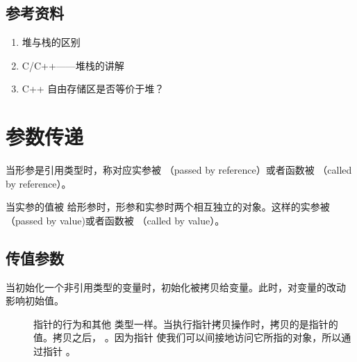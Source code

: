 \documentclass[letterpaper,10pt,english]{sphinxmanual}
\begin{document}
\subsection{参考资料}
\label{\detokenize{cpp/11_heapStack:id9}}\begin{enumerate}
\item {} 
堆与栈的区别

\end{enumerate}
\begin{quote}

\end{quote}
\begin{enumerate}
\setcounter{enumi}{1}
\item {} 
C/C++——堆栈的讲解

\end{enumerate}
\begin{quote}

\end{quote}
\begin{enumerate}
\setcounter{enumi}{2}
\item {} 
C++ 自由存储区是否等价于堆？

\end{enumerate}
\begin{quote}

\end{quote}


\section{参数传递}
\label{\detokenize{cpp/12_argPass::doc}}\label{\detokenize{cpp/12_argPass:id1}}
当形参是引用类型时，称对应实参被  （passed by reference）或者函数被  （called by reference）。

当实参的值被  给形参时，形参和实参时两个相互独立的对象。这样的实参被  （passed by value)或者函数被  （called by value）。


\subsection{传值参数}
\label{\detokenize{cpp/12_argPass:id2}}
当初始化一个非引用类型的变量时，初始化被拷贝给变量。此时，对变量的改动  影响初始值。
\begin{description}
\item[{}] \leavevmode
指针的行为和其他  类型一样。当执行指针拷贝操作时，拷贝的是指针的值。拷贝之后，  。因为指针
使我们可以间接地访问它所指的对象，所以通过指针  。

\end{description}
\end{document}
